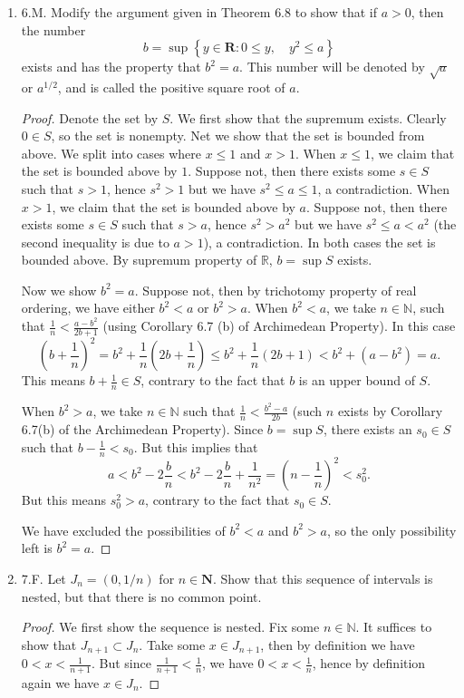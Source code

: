 \begin{enumerate}
	\item 6.M. Modify the argument given in Theorem $6.8$ to show that if $a>0$, then the number
\[
b=\sup \left\{y \in \boldsymbol{R}: 0 \leq y, \quad y^{2} \leq a\right\}
\]
exists and has the property that $b^{2}=a$. This number will be denoted by $\sqrt{a}$ or $a^{1 / 2}$, and is called the positive square root of $a$.
\begin{proof}
	Denote the set by $S$. We first show that the supremum exists. Clearly $0 \in S$, so the set is nonempty. Net we show that the set is bounded from above. We split into cases where $x\le 1$ and $x>1$. When  $x\le 1$, we claim that the set is bounded above by $1$. Suppose not, then there exists some $s \in S$ such that $s >1$, hence $s^2 >1$ but we have $s^2 \le a \le 1$, a contradiction. When $x>1$, we claim that the set is bounded above by $a$. Suppose not, then there exists some $s \in S$ such that $s > a$, hence $s^2 > a^2$ but we have $s^2 \le  a < a^2$ (the second inequality is due to $a>1$), a contradiction. In both cases the set is bounded above. By supremum property of $\mathbb{R}$, $b = \operatorname{sup} S$ exists.

	Now we show $b^2 = a$. Suppose not, then by trichotomy property of real ordering, we have either $b^2 < a$ or $b^2 > a$. When $b^2 < a$, we take $n \in \mathbb{N}$, such that $\frac{1}{n}<\frac{a-b^2}{2b+1}$ (using Corollary 6.7 (b) of Archimedean Property). In this case \[
		(b+\frac{1}{n})^2 = b^2 + \frac{1}{n}\left( 2b + \frac{1}{n} \right) \le b^2 + \frac{1}{n}\left( 2b + 1 \right) < b^2 + (a-b^2) = a
	.\] 
This means $b + \frac{1}{n} \in S$, contrary to the fact that $b$ is an upper bound of $S$.

When $b^2>a$, we take $n \in \mathbb{N}$ such that $\frac{1}{n} < \frac{b^2 - a}{2b}$ (such $n$ exists by Corollary 6.7(b) of the Archimedean Property). Since $b = \operatorname{sup} S$, there exists an $s_0\in S$ such that $b - \frac{1}{n} <s_0$. But this implies that
\[
a < b^2 - 2 \frac{b}{n} < b^2 - 2 \frac{b}{n} + \frac{1}{n^2} = \left( n-\frac{1}{n} \right) ^2 < s_0^2
.\] 
But this means $s_0^2 > a$, contrary to the fact that $s_0 \in S$.

We have excluded the possibilities of $b^2<a$ and $b^2>a$, so the only possibility left is $b^2 = a$.
\end{proof}

	\item 7.F. Let $J_{n}=(0,1 / n)$ for $n \in \mathbf{N}$. Show that this sequence of intervals is nested, but that there is no common point.
\begin{proof}
	We first show the sequence is nested. Fix some $n \in \mathbb{N}$. It suffices to show that $J_{n+1} \subset J_n$. Take some $x \in J_{n+1}$, then by definition we have $0<x<\frac{1}{n+1}$. But since $\frac{1}{n+1}<\frac{1}{n}$, we have $0<x<\frac{1}{n}$, hence by definition again we have $x \in J_n$.


\end{proof}
\end{enumerate}
